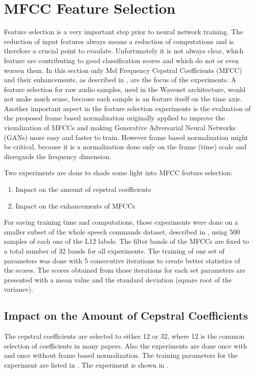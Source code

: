 
\section{MFCC Feature Selection}\label{sec:exp_fs}
\thesisStateNotReady
Feature selection is a very important step prior to neural network training.
The reduction of input features always means a reduction of computations and is therefore a crucial point to evaulate.
Unfortunately it is not always clear, which feature are contributing to good classification scores and which do not or even worsen them.
In this section only Mel Frequency Cepstral Coefficients (MFCC) and their enhancements, as described in , are the focus of the experiments.
A feature selection for raw audio samples, used in the Wavenet architecture, would not make much sense, because each sample is an feature itself on the time axis.
Another important aspect in the feature selection experiments is the evaluation of the proposed frame based normalization  originally applied to improve the visualization of MFCCs and making Generative Adversarial Neural Networks (GANs) more easy and faster to train.
However frame based normalization might be critical, because it is a normalization done only on the frame (time) scale and disregards the frequency dimension.

Two experiments are done to shade some light into MFCC feature selection:
\begin{enumerate}
    \item Impact on the amount of cepstral coefficients
    \item Impact on the enhancements of MFCCs
\end{enumerate}
For saving training time and computations, those experiments were done on a smaller subset of the whole speech commands dataset, described in , using 500 samples of each one of the L12 labels.
The filter bands of the MFCCs are fixed to a total number of 32 bands for all experiments.
The training of one set of parameters was done with 5 consecutive iterations to create better statistics of the scores.
The scores obtained from those iterations for each set parameters are presented with a mean value and the standard deviation (square root of the variance).



\subsection{Impact on the Amount of Cepstral Coefficients}
The cepstral coefficients are selected to either 12 or 32, where 12 is the common selection of coefficients in many papers.
Also the experiments are done once with and once without frame based normalization.
The training parameters for the experiment are listed in .
The experiment is shown in .

%


